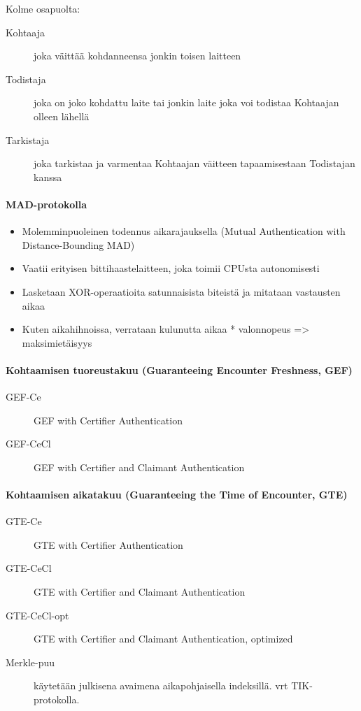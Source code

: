 \documentclass[finnish]{tktltiki2}
\theoremstyle{definition}
\theoremstyle{remark}
\begin{document}
Kolme osapuolta: 
\begin{description}
\item[Kohtaaja] joka väittää kohdanneensa jonkin toisen laitteen
\item[Todistaja] joka on joko kohdattu laite tai jonkin laite joka voi todistaa Kohtaajan olleen lähellä
\item[Tarkistaja] joka tarkistaa ja varmentaa Kohtaajan väitteen tapaamisestaan Todistajan kanssa
\end{description}

\paragraph{MAD-protokolla}

\begin{itemize}
\item Molemminpuoleinen todennus aikarajauksella (Mutual Authentication with Distance-Bounding MAD)
\item Vaatii erityisen bittihaastelaitteen, joka toimii CPUsta autonomisesti
\item Lasketaan XOR-operaatioita satunnaisista biteistä ja mitataan vastausten aikaa
\item Kuten aikahihnoissa, verrataan kulunutta aikaa * valonnopeus => maksimietäisyys
\end{itemize}

\paragraph{Kohtaamisen tuoreustakuu (Guaranteeing Encounter Freshness, GEF)}

\begin{description}
\item[GEF-Ce] GEF with Certifier Authentication
\item[GEF-CeCl] GEF with Certifier and Claimant Authentication
\end{description}

\paragraph{Kohtaamisen aikatakuu (Guaranteeing the Time of Encounter, GTE)}

\begin{description}
\item[GTE-Ce] GTE with Certifier Authentication
\item[GTE-CeCl] GTE with Certifier and Claimant Authentication
\item[GTE-CeCl-opt] GTE with Certifier and Claimant Authentication, optimized
\item[Merkle-puu] käytetään julkisena avaimena aikapohjaisella indeksillä. vrt TIK-protokolla.
\end{description}
\end{document}
